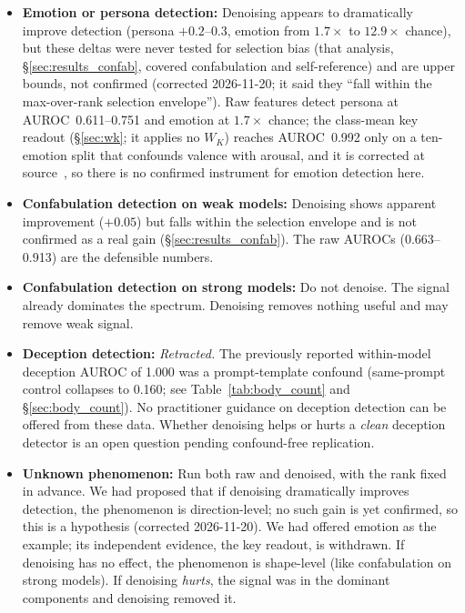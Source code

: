 \documentclass[11pt,a4paper]{article}
\begin{document}
\begin{itemize}[nosep]
    \item \textbf{Emotion or persona detection:} Denoising appears to
    dramatically improve detection (persona $+0.2$--$0.3$, emotion from
    $1.7\times$ to $12.9\times$ chance), but these deltas were never
    tested for selection bias (that analysis, \S\ref{sec:results_confab},
    covered confabulation and self-reference) and are upper bounds, not
    confirmed (corrected 2026-11-20; it said they ``fall within the
    max-over-rank selection envelope''). Raw features detect persona at
    AUROC~0.611--0.751 and emotion at $1.7\times$ chance; the class-mean
    key readout (\S\ref{sec:wk}; it applies no $W_K$) reaches AUROC~0.992
    only on a ten-emotion split that confounds valence with arousal, and it
    is corrected at source~\citep{lyra_p4}, so there is no confirmed
    instrument for emotion detection here.

    \item \textbf{Confabulation detection on weak models:} Denoising
    shows apparent improvement ($+0.05$) but falls within the selection
    envelope and is not confirmed as a real gain
    (\S\ref{sec:results_confab}). The raw AUROCs (0.663--0.913) are
    the defensible numbers.

    \item \textbf{Confabulation detection on strong models:} Do not denoise.
    The signal already dominates the spectrum. Denoising removes nothing
    useful and may remove weak signal.

    \item \textbf{Deception detection:} \emph{Retracted.} The previously
    reported within-model deception AUROC of 1.000 was a prompt-template
    confound (same-prompt control collapses to 0.160; see
    Table~\ref{tab:body_count} and \S\ref{sec:body_count}). No
    practitioner guidance on deception detection can be offered from
    these data. Whether denoising helps or hurts a \emph{clean}
    deception detector is an open question pending confound-free
    replication.

    \item \textbf{Unknown phenomenon:} Run both raw and denoised, with the
    rank fixed in advance. We had proposed that if denoising
    dramatically improves detection, the phenomenon is direction-level; no
    such gain is yet confirmed, so this is a hypothesis (corrected
    2026-11-20). We had offered emotion as the example; its independent
    evidence, the key readout, is withdrawn. If denoising has no effect, the phenomenon is shape-level (like
    confabulation on strong models). If denoising \emph{hurts}, the signal was
    in the dominant components and denoising removed it.
\end{itemize}
\end{document}
